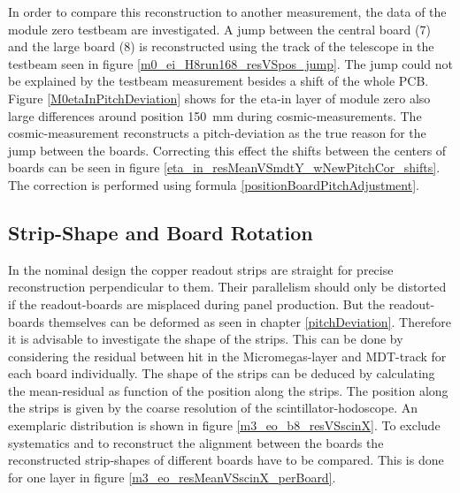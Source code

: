 \documentclass[
twoside,            %
BCOR1.4cm,          %
10pt,               %
headings=normal,    %
headsepline,        %
clearplainpage,		%
final,              %
div=14,
open=right,
bibliography=toc
]{scrreprt}
\begin{document}
In order to compare this reconstruction to another measurement, the data of the module zero testbeam are investigated.
A jump between the central board (7) and the large board (8) is reconstructed using the track of the telescope in the testbeam seen in figure \ref{m0_ei_H8run168_resVSpos_jump}.
The jump could not be explained by the testbeam measurement besides a shift of the whole PCB.
Figure \ref{M0etaInPitchDeviation} shows for the eta-in layer of module zero also large differences around position \SI{150}{mm} during cosmic-measurements.
The cosmic-measurement reconstructs a pitch-deviation as the true reason for the jump between the boards.
Correcting this effect the shifts between the centers of boards can be seen in figure \ref{eta_in_resMeanVSmdtY_wNewPitchCor_shifts}.
The correction is performed using formula \ref{positionBoardPitchAdjustment}.

\subsection{Strip-Shape and Board Rotation}\label{shapeNrotation}

In the nominal design the copper readout strips are straight for precise reconstruction perpendicular to them.
Their parallelism should only be distorted if the readout-boards are misplaced during panel production.
But the readout-boards themselves can be deformed as seen in chapter \ref{pitchDeviation}.
Therefore it is advisable to investigate the shape of the strips.
This can be done by considering the residual between hit in the Micromegas-layer and MDT-track for each board individually.
The shape of the strips can be deduced by calculating the mean-residual as function of the position along the strips.
The position along the strips is given by the coarse resolution of the scintillator-hodoscope.
An exemplaric distribution is shown in figure \ref{m3_eo_b8_resVSscinX}.
To exclude systematics and to reconstruct the alignment between the boards the reconstructed strip-shapes of different boards have to be compared.
This is done for one layer in figure \ref{m3_eo_resMeanVSscinX_perBoard}.
\end{document}
